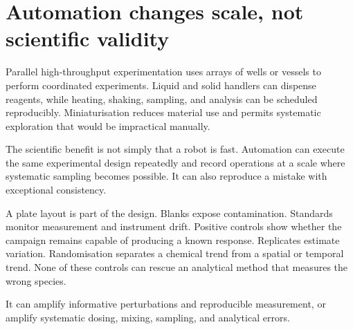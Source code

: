 \section{Automation changes scale, not scientific validity}

Parallel high-throughput experimentation uses arrays of wells or vessels to perform coordinated experiments.
Liquid and solid handlers can dispense reagents, while heating, shaking, sampling, and analysis can be scheduled reproducibly.
Miniaturisation reduces material use and permits systematic exploration that would be impractical manually.

The scientific benefit is not simply that a robot is fast.
Automation can execute the same experimental design repeatedly and record operations at a scale where systematic sampling becomes possible.
It can also reproduce a mistake with exceptional consistency.


A plate layout is part of the design.
Blanks expose contamination.
Standards monitor measurement and instrument drift.
Positive controls show whether the campaign remains capable of producing a known response.
Replicates estimate variation.
Randomisation separates a chemical trend from a spatial or temporal trend.
None of these controls can rescue an analytical method that measures the wrong species.

\begin{warningbox}
  It can amplify informative perturbations and reproducible measurement, or amplify systematic dosing, mixing, sampling, and analytical errors.
\end{warningbox}

